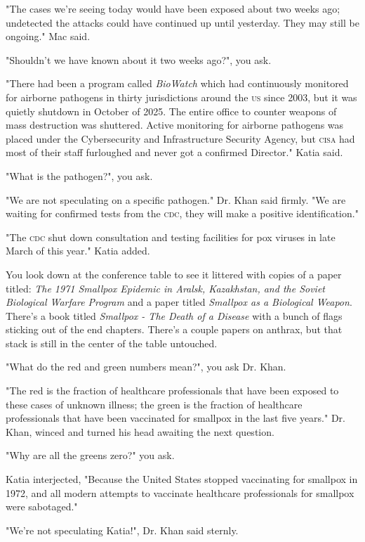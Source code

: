 \documentclass[a5paper, symmetric]{tufte-book}
\begin{document}
"The cases we're seeing today would have been exposed about two weeks ago; undetected the attacks could have continued up until yesterday. They may still be ongoing." Mac said.

"Shouldn't we have known about it two weeks ago?", you ask.

"There had been a program called \textit{BioWatch} which had continuously monitored for airborne pathogens in thirty jurisdictions around the \textsc{us} since 2003, but it was quietly shutdown in October of 2025. The entire office to counter weapons of mass destruction was shuttered. Active monitoring for airborne pathogens was placed under the Cybersecurity and Infrastructure Security Agency, but \textsc{cisa} had most of their staff furloughed and never got a confirmed Director." Katia said.

"What is the pathogen?", you ask.

"We are not speculating on a specific pathogen." Dr. Khan said firmly. "We are waiting for confirmed tests from the \textsc{cdc}, they will make a positive identification." 

"The \textsc{cdc} shut down consultation and testing facilities for pox viruses in late March of this year." Katia added.

You look down at the conference table to see it littered with copies of a paper titled: \textit{The 1971 Smallpox Epidemic in Aralsk, Kazakhstan, and the Soviet Biological Warfare Program} and a paper titled \textit{Smallpox as a Biological Weapon}. There's a book titled \textit{Smallpox - The Death of a Disease} with a bunch of flags sticking out of the end chapters. There's a couple papers on anthrax, but that stack is still in the center of the table untouched.

"What do the red and green numbers mean?", you ask Dr. Khan. 

"The red is the fraction of healthcare professionals that have been exposed to these cases of unknown illness; the green is the fraction of healthcare professionals that have been vaccinated for smallpox in the last five years." Dr. Khan, winced and turned his head awaiting the next question. 

"Why are all the greens zero?" you ask. 

Katia interjected, "Because the United States stopped vaccinating for smallpox in 1972, and all modern attempts to vaccinate healthcare professionals for smallpox were sabotaged."

"We're not speculating Katia!", Dr. Khan said sternly. 
\end{document}
